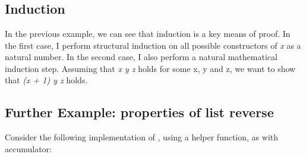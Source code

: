 \documentclass[12pt,twoside,notitlepage]{report}
\begin{document}
\begin{code}
\>[0]\<[2]%
\>[2] \AgdaSymbol{:} \AgdaSymbol{(}   \AgdaSymbol{:} \AgdaSymbol{)}  \AgdaSymbol{(} \AgdaPrimitive{+} \AgdaSymbol{(} \AgdaPrimitive{+} \AgdaSymbol{))}  \AgdaSymbol{((} \AgdaPrimitive{+} \AgdaSymbol{)} \AgdaPrimitive{+} \AgdaSymbol{)}\<%
\\
\>[0]\<[2]%
\>[2]    \AgdaSymbol{=} \<%
\\
\>[0]\<[2]%
\>[2] \AgdaSymbol{(} \AgdaSymbol{)}        \AgdaSymbol{=} \<%
\\
\end{code}

\subsection{Induction}

In the previous example, we can see that induction is a key means of proof. In the first case, I perform structural induction on all possible constructors of \textit{x} as a natural number.
 In the second case, I also perform a natural mathematical induction step. Assuming that  \textit{x y z} holds for some x, y and z, we want to show that  \textit{(x + 1) y z} holds.

\subsection{Further Example: properties of list reverse}
Consider the following implementation of , using a helper function,  as  with accumulator: 
\end{document}
